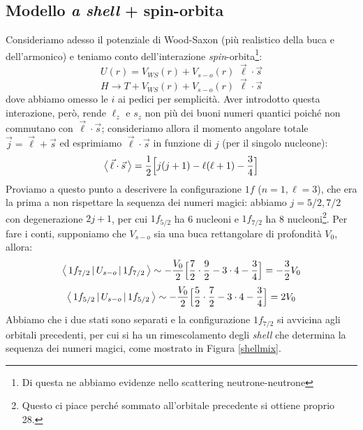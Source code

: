 \subsection{Modello \textit{a shell} + spin-orbita}
Consideriamo adesso il potenziale di Wood-Saxon (più realistico della buca e dell'armonico) e teniamo conto dell'interazione \textit{spin}-orbita\footnote{Di questa ne abbiamo evidenze nello scattering neutrone-neutrone}:
$$U (r) = V_{WS}(r) +  V_{s-o}(r)\; \vec{\ell} \cdot \vec{s} $$
$$ H \to T+V_{WS}(r)+V_{s-o}(r)\;\vec{\ell} \cdot \vec{s}$$
dove abbiamo omesso le $i$ ai pedici per semplicità. Aver introdotto questa interazione, però, rende $\ell_z$ e $s_z$ non più dei buoni numeri quantici poiché non commutano con $\vec{\ell}\cdot\vec{s}$; consideriamo allora il momento angolare totale $\vec{j}= \vec{\ell} + \vec{s}$ ed esprimiamo $\vec{\ell}\cdot\vec{s}$ in funzione di $j$ (per il singolo nucleone):
$$\bigl\langle\, \vec{\ell}\cdot\vec{s}\, \bigr\rangle = \frac{1}{2}\Bigl[j(j+1) - \ell(\ell+1) - \frac{3}{4} \Bigr]$$
Proviamo a questo punto a descrivere la configurazione $1f$ ($n=1,\ell=3$), che era la prima a non rispettare la sequenza dei numeri magici: abbiamo $j=5/2,7/2$ con degenerazione $2j+1$, per cui $1f_{5/2}$ ha 6 nucleoni e $1f_{7/2}$ ha 8 nucleoni\footnote{Questo ci piace perché sommato all'orbitale precedente si ottiene proprio 28.}. Per fare i conti, supponiamo che $V_{s-o}$ sia una buca rettangolare di profondità $V_0$, allora:
$$\bigl\langle\, 1f_{7/2}\, |\,U_{s-o}\, |\,1f_{7/2}\, \bigr\rangle \sim - \frac{V_0}{2}\Bigl[ \frac{7}{2}\cdot\frac{9}{2} - 3\cdot 4 - \frac{3}{4} \Bigr] = -\frac{3}{2} V_0$$
$$\bigl\langle\, 1f_{5/2}\, |\,U_{s-o}\, |\,1f_{5/2}\, \bigr\rangle \sim - \frac{V_0}{2}\Bigl[ \frac{5}{2}\cdot\frac{7}{2} - 3\cdot 4 - \frac{3}{4} \Bigr] = 2 V_0$$
Abbiamo che i due stati sono separati e la configurazione $1f_{7/2}$ si avvicina agli orbitali precedenti, per cui si ha un rimescolamento degli \textit{shell} che determina la sequenza dei numeri magici, come mostrato in Figura \ref{shellmix}.
